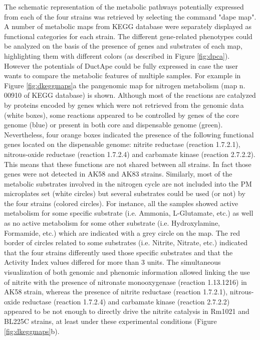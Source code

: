 The schematic representation of the metabolic pathways potentially expressed from each of the four strains was retrieved by selecting the command "dape map". A number of metabolic maps from KEGG database were separately displayed as functional categories for each strain. The different gene-related phenotypes could be analyzed on the basis of the presence of genes and substrates of each map, highlighting them with different colors (as described in Figure \ref{fig:dpca}). However the potentials of DuctApe could be fully expressed in case the user wants to compare the metabolic features of multiple samples. For example in Figure \ref{fig:dkeggmaps}a the pangenomic map for nitrogen metabolism (map n. 00910 of KEGG database) is shown. Although most of the reactions are catalyzed by proteins encoded by genes which were not retrieved from the genomic data (white boxes), some reactions appeared to be controlled by genes of the core genome (blue) or present in both core and dispensable genome (green). Nevertheless, four orange boxes indicated the presence of the following functional genes located on the dispensable genome: nitrite reductase (reaction 1.7.2.1), nitrous-oxide reductase (reaction 1.7.2.4) and carbamate kinase (reaction 2.7.2.2). This means that these functions are not shared between all  strains. In fact those genes were not detected in AK58 and AK83 strains. Similarly, most of the metabolic substrates involved in the nitrogen cycle are not included into the PM microplates set (white circles) but several substrates could be used (or not) by the four strains (colored circles). For instance, all the samples showed active metabolism for some specific substrate (i.e. Ammonia, L-Glutamate, etc.) as well as no active metabolism for some other substrate (i.e. Hydroxylamine, Formamide, etc.) which are indicated with a grey circle on the map. The red border of circles related to some substrates (i.e. Nitrite, Nitrate, etc.) indicated that the four strains differently used those specific substrates and that the Activity Index values differed for more than 3 units. The simultaneous visualization of both genomic and phenomic information allowed linking the use of nitrite with the presence of nitronate monooxygenase (reaction 1.13.1216) in AK58 strain, whereas the presence of nitrite reductase (reaction 1.7.2.1), nitrous-oxide reductase (reaction 1.7.2.4) and carbamate kinase (reaction 2.7.2.2) appeared to be not enough to directly drive the nitrite catalysis in Rm1021 and BL225C strains, at least under these experimental conditions (Figure \ref{fig:dkeggmaps}b).

